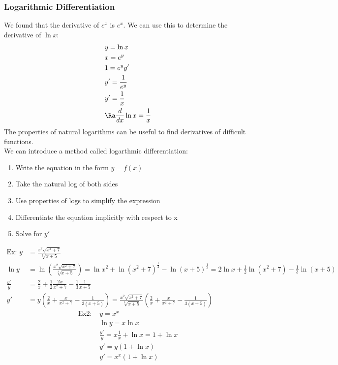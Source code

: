 \subsubsection{Logarithmic Differentiation}
We found that the derivative of $e^x$ is $e^x$. We can use this to determine the derivative of $\ln x$:
\begin{align*}
    &y=\ln x\\
    &x=e^y\\
    &1=e^yy'\\
    &y'=\frac{1}{e^y}\\
    &y'=\frac{1}{x}\\
    &\Ra\frac{d}{dx}\ln x=\frac{1}{x}
\end{align*}
The properties of natural logarithms can be useful to find derivatives of difficult functions.\\
We can introduce a method called logarthmic differentiation:
\begin{enumerate}
    \item Write the equation in the form $y=f(x)$
    \item Take the natural log of both sides
    \item Use properties of logs to simplify the expression
    \item Differentiate the equation implicitly with respect to x
    \item Solve for $y'$
\end{enumerate}
\begin{align*}
    \text{Ex: }y&=\frac{x^2\sqrt{x^2+7}}{\sqrt[3]{x+5}}\\
    \ln y&=\ln\left(\frac{x^2\sqrt{x^2+7}}{\sqrt[3]{x+5}}\right)=\ln x^2+\ln(x^2+7)^\frac{1}{2}-\ln(x+5)^\frac{1}{3}=2\ln x+\frac{1}{2}\ln(x^2+7)-\frac{1}{3}\ln(x+5)\\
    \frac{y'}{y}&=\frac{2}{x}+\frac{1}{2}\frac{2x}{x^2+7}-\frac{1}{3}\frac{1}{x+5}\\
    y'&=y\left(\frac{2}{x}+\frac{x}{x^2+7}-\frac{1}{3(x+5)}\right)=\frac{x^2\sqrt{x^2+7}}{\sqrt[3]{x+5}}\left(\frac{2}{x}+\frac{x}{x^2+7}-\frac{1}{3(x+5)}\right)
\end{align*}
\begin{align*}
    \text{Ex2: }&y=x^x\\
    &\ln y=x\ln x\\
    &\frac{y'}{y}=x\frac{1}{x}+\ln x=1+\ln x\\
    &y'=y(1+\ln x)\\
    &y'=x^x(1+\ln x)
\end{align*}
